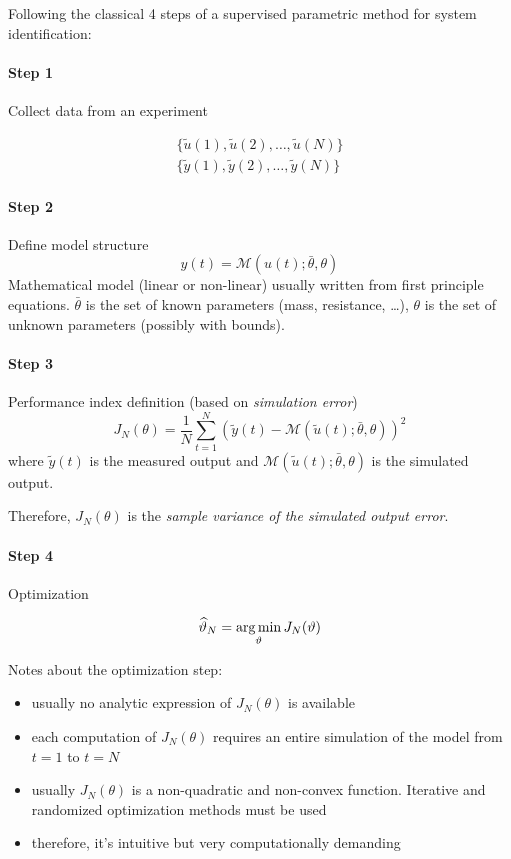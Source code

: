 Following the classical 4 steps of a supervised parametric method for system identification:

\paragraph{Step 1} Collect data from an experiment

\begin{align*}
    \{ \tilde{u}(1), \tilde{u}(2), \dots, \tilde{u}(N) \} \\
    \{ \tilde{y}(1), \tilde{y}(2), \dots, \tilde{y}(N) \}
\end{align*}

\paragraph{Step 2} Define model structure
\[
    y(t) = \mathcal{M}(u(t); \bar{\theta}, \theta)
\]
Mathematical model (linear or non-linear) usually written from first principle equations. $\bar{\theta}$ is the set of known parameters (mass, resistance, \dots), $\theta$ is the set of unknown parameters (possibly with bounds).

\paragraph{Step 3} Performance index definition (based on \emph{simulation error})
\[
    J_N(\theta) = \frac{1}{N} \sum_{t=1}^N \left( \tilde{y}(t) - \mathcal{M}(\tilde{u}(t); \bar{\theta}, \theta) \right)^2
\]
where $\tilde{y}(t)$ is the measured output and $\mathcal{M}(\tilde{u}(t); \bar{\theta}, \theta)$ is the simulated output.

Therefore, $J_N(\theta)$ is the \emph{sample variance of the simulated output error}.

\paragraph{Step 4} Optimization

\[
    \widehat{\vartheta}_N = \operatorname*{arg\,min}_\vartheta J_N(\vartheta)
\]

Notes about the optimization step:
\begin{itemize}
    \item usually no analytic expression of $J_N(\theta)$ is available
    \item each computation of $J_N(\theta)$ requires an entire simulation of the model from $t=1$ to $t=N$
    \item usually $J_N(\theta)$ is a non-quadratic and non-convex function. Iterative and randomized optimization methods must be used
    \item therefore, it's intuitive but very computationally demanding
\end{itemize}

